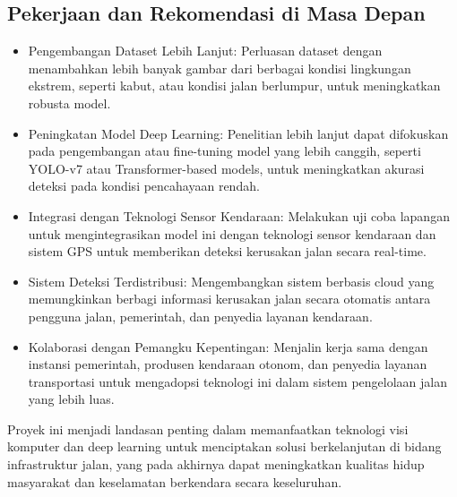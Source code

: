 \documentclass[12pt,a4paper]{article}
\begin{document}
\begin{adjustwidth}{3em}{0pt}
\subsection{Pekerjaan dan Rekomendasi di Masa Depan}
\begin{itemize}
    \item Pengembangan Dataset Lebih Lanjut: Perluasan dataset dengan menambahkan lebih banyak gambar dari berbagai kondisi lingkungan ekstrem, seperti kabut, atau kondisi jalan berlumpur, untuk meningkatkan robusta model.
    \item Peningkatan Model Deep Learning: Penelitian lebih lanjut dapat difokuskan pada pengembangan atau fine-tuning model yang lebih canggih, seperti YOLO-v7 atau Transformer-based models, untuk meningkatkan akurasi deteksi pada kondisi pencahayaan rendah.
    \item Integrasi dengan Teknologi Sensor Kendaraan: Melakukan uji coba lapangan untuk mengintegrasikan model ini dengan teknologi sensor kendaraan dan sistem GPS untuk memberikan deteksi kerusakan jalan secara real-time.
    \item Sistem Deteksi Terdistribusi: Mengembangkan sistem berbasis cloud yang memungkinkan berbagi informasi kerusakan jalan secara otomatis antara pengguna jalan, pemerintah, dan penyedia layanan kendaraan.
    \item Kolaborasi dengan Pemangku Kepentingan: Menjalin kerja sama dengan instansi pemerintah, produsen kendaraan otonom, dan penyedia layanan transportasi untuk mengadopsi teknologi ini dalam sistem pengelolaan jalan yang lebih luas.
\end{itemize}
\hspace{0.5cm} Proyek ini menjadi landasan penting dalam memanfaatkan teknologi visi komputer dan deep learning untuk menciptakan solusi berkelanjutan di bidang infrastruktur jalan, yang pada akhirnya dapat meningkatkan kualitas hidup masyarakat dan keselamatan berkendara secara keseluruhan.

\end{adjustwidth}
\newpage
\end{document}
